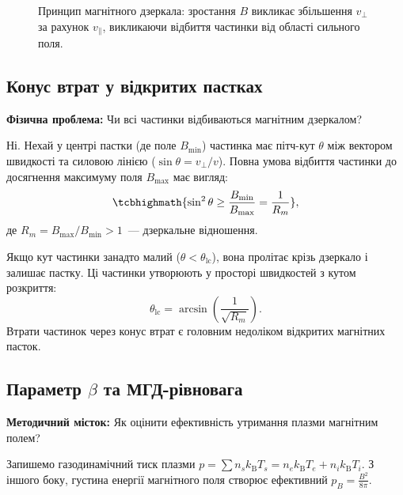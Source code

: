 \begin{figure}[htbp]\centering
	\caption{Принцип магнітного дзеркала: зростання $B$ викликає збільшення $v_\perp$ за рахунок $v_\parallel$, викликаючи відбиття частинки від області сильного поля.}\label{fig:magnetic-mirror}
\end{figure}

\subsection{Конус втрат у відкритих пастках}

\textbf{Фізична проблема:} Чи всі частинки відбиваються магнітним дзеркалом?

Ні. Нехай у центрі пастки (де поле $B_{\min}$) частинка має пітч-кут $\theta$ між вектором швидкості та силовою лінією ($\sin\theta = v_\perp / v$). Повна умова відбиття частинки до досягнення максимуму поля $B_{\max}$ має вигляд:
\begin{equation}
	\tcbhighmath{\sin^2\theta \ge \frac{B_{\min}}{B_{\max}} = \frac{1}{R_m}},
\end{equation}
де $R_m = B_{\max}/B_{\min} > 1$~--- дзеркальне відношення.

Якщо кут частинки занадто малий ($\theta < \theta_{\text{lc}}$), вона пролітає крізь дзеркало і залишає пастку. Ці частинки утворюють  у просторі швидкостей з кутом розкриття:
\begin{equation}
	\theta_{\text{lc}} = \arcsin\left(\frac{1}{\sqrt{R_m}}\right).
\end{equation}
Втрати частинок через конус втрат є головним недоліком відкритих магнітних пасток.

\subsection{Параметр \texorpdfstring{$\beta$}{beta} та МГД-рівновага}

\textbf{Методичний місток:} Як оцінити ефективність утримання плазми магнітним полем?

Запишемо газодинамічний тиск плазми $p = \sum n_s k_{\mathrm B}T_s = n_e k_{\mathrm B}T_e + n_i k_{\mathrm B}T_i$.
З іншого боку, густина енергії магнітного поля створює ефективний  $p_B = \frac{B^2}{8\pi}$.

